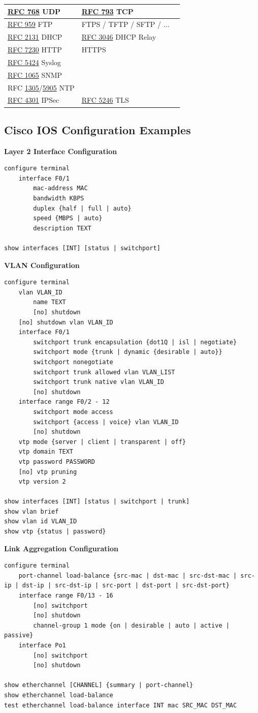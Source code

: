 \documentclass[12pt]{article}
\newcommand{\rfc}[1]{\href{https://datatracker.ietf.org/doc/html/rfc#1}{#1}}
\newcommand{\RFC}[1]{\href{https://datatracker.ietf.org/doc/html/rfc#1}{RFC #1}}
\begin{document}
\begin{table}[H]
\begin{tabular}{@{} l l r @{}}
	\RFC{768} UDP				& \RFC{793} TCP			& \Cref{subsec:UDP,subsec:TCP}\\\hline
	\RFC{959} FTP				& FTPS / TFTP / SFTP / ...	& \Cref{subsec:FTP}\\
	\RFC{2131} DHCP				& \RFC{3046} DHCP Relay	& \Cref{subsec:DHCP}\\
	\RFC{7230} HTTP				& HTTPS				& \Cref{subsec:HTTP}\\
	\RFC{5424} Syslog				&					& \Cref{subsec:SYSLOG}\\
	\RFC{1065} SNMP				&					&\\
	RFC \rfc{1305}/\rfc{5905} NTP		&					&\\
	\RFC{4301} IPSec				& \RFC{5246} TLS			&\\\hline	
	\end{tabular}\end{table}


	\newpage
	\subsection{Cisco IOS Configuration Examples \label{subsec:CONFIG}}
	\textbf{Layer 2 Interface Configuration}
	\begin{lstlisting}
configure terminal
	interface F0/1
		mac-address MAC
		bandwidth KBPS
		duplex {half | full | auto}
		speed {MBPS | auto}
		description TEXT

show interfaces [INT] [status | switchport]
	\end{lstlisting}

	\textbf{VLAN Configuration}
	\begin{lstlisting}
configure terminal
	vlan VLAN_ID
		name TEXT
		[no] shutdown
	[no] shutdown vlan VLAN_ID
	interface F0/1
		switchport trunk encapsulation {dot1Q | isl | negotiate}
		switchport mode {trunk | dynamic {desirable | auto}}
		switchport nonegotiate
		switchport trunk allowed vlan VLAN_LIST
		switchport trunk native vlan VLAN_ID
		[no] shutdown
	interface range F0/2 - 12
		switchport mode access
		switchport {access | voice} vlan VLAN_ID
		[no] shutdown
	vtp mode {server | client | transparent | off}
	vtp domain TEXT
	vtp password PASSWORD
	[no] vtp pruning
	vtp version 2

show interfaces [INT] [status | switchport | trunk]
show vlan brief
show vlan id VLAN_ID
show vtp {status | password}
	\end{lstlisting}

	\textbf{Link Aggregation Configuration}
	\begin{lstlisting}
configure terminal
	port-channel load-balance {src-mac | dst-mac | src-dst-mac | src-ip | dst-ip | src-dst-ip | src-port | dst-port | src-dst-port}
	interface range F0/13 - 16
		[no] switchport
		[no] shutdown
		channel-group 1 mode {on | desirable | auto | active | passive}
	interface Po1
		[no] switchport
		[no] shutdown

show etherchannel [CHANNEL] {summary | port-channel}
show etherchannel load-balance
test etherchannel load-balance interface INT mac SRC_MAC DST_MAC
	\end{lstlisting}
\end{document}
